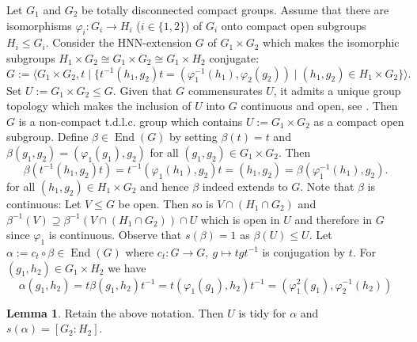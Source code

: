 \documentclass{article}
\DeclareMathOperator\End{End}
\theoremstyle{definition}
\newtheorem{lemma}[theorem]{Lemma}
\begin{document}
Let $G_{1}$ and $G_{2}$ be totally disconnected compact groups. Assume that there are isomorphisms $\varphi_{i}:G_{i}\to H_{i}$ ($i\in\{1,2\}$) of $G_{i}$ onto compact open subgroups $H_{i}\le G_{i}$. Consider the HNN-extension $G$ of $G_{1}\times G_{2}$ which makes the isomorphic subgroups $H_{1}\times G_{2}\cong G_{1}\times G_{2}\cong G_{1}\times H_{2}$ conjugate:
\begin{displaymath}
 G:=\langle G_{1}\!\times\! G_{2},t\mid\{t^{-1}(h_{1},g_{2})t=(\varphi_{1}^{-1}(h_{1}),\varphi_{2}(g_{2}))\mid (h_{1},g_{2})\in H_{1}\!\times\! G_{2}\}\rangle.
\end{displaymath}
Set $U:=G_{1}\times G_{2}\le G$. Given that $G$ commensurates $U$, it admits a unique group topology which makes the inclusion of $U$ into $G$ continuous and open, see \cite[Chapter III, \S 1.2, Proposition 1]{Bou98}. Then $G$ is a non-compact t.d.l.c. group which contains $U\!:=\!G_{1}\!\times\! G_{2}$ as a compact open subgroup. Define $\beta\in\End(G)$ by setting $\beta(t)=t$ and $\beta(g_{1},g_{2})=(\varphi_{1}(g_{1}),g_{2})$ for all $(g_{1},g_{2})\in G_{1}\times G_{2}$. Then
\begin{displaymath}
  \beta(t^{-1}(h_{1},g_{2})t)=t^{-1}(\varphi_{1}(h_{1}),g_{2})t=(h_{1},g_{2})=\beta(\varphi_{1}^{-1}(h_{1}),g_{2}).
\end{displaymath}
for all $(h_{1},g_{2})\in H_{1}\times G_{2}$ and hence $\beta$ indeed extends to $G$. Note that $\beta$ is continuous: Let $V\le G$ be open. Then so is $V\cap(H_{1}\cap G_{2})$ and $\beta^{-1}(V)\supseteq\beta^{-1}(V\cap(H_{1}\cap G_{2}))\cap U$ which is open in $U$ and therefore in $G$ since $\varphi_{1}$ is continuous. Observe that $s(\beta)=1$ as $\beta(U)\le U$. Let $\alpha:=c_{t}\circ\beta\in\End(G)$ where $c_{t}:G\to G,\ g\mapsto tgt^{-1}$ is conjugation by $t$. For $(g_{1},h_{2})\in G_{1}\!\times\! H_{2}$ we have
\begin{equation}
 \alpha(g_{1},h_{2})=t\beta(g_{1},h_{2})t^{-1}=t(\varphi_{1}(g_{1}),h_{2})t^{-1}=(\varphi_{1}^{2}(g_{1}),\varphi_{2}^{-1}(h_{2}))
 \tag{E}
 \label{eq:def_alpha}
\end{equation}

\begin{lemma}\label{lem:hnn_tidy}
Retain the above notation. Then $U$ is tidy for $\alpha$ and $s(\alpha)\! =\! [G_2:H_2]$.
\end{lemma}
\end{document}
